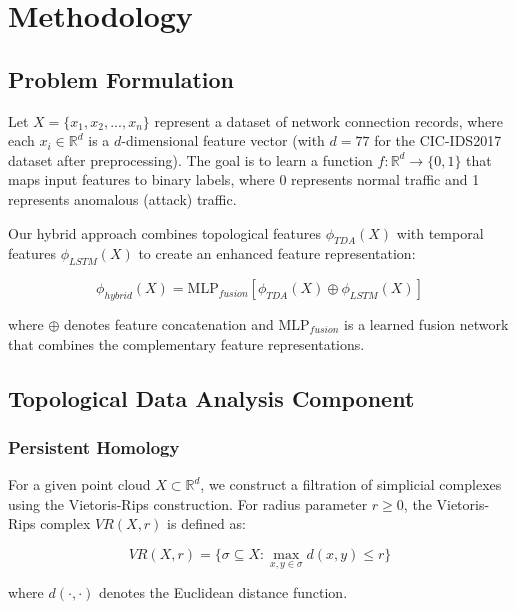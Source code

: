 \documentclass[conference]{IEEEtran}
\begin{document}
\section{Methodology}

\subsection{Problem Formulation}

Let $X = \{x_1, x_2, ..., x_n\}$ represent a dataset of network connection records, where each $x_i \in \mathbb{R}^d$ is a $d$-dimensional feature vector (with $d = 77$ for the CIC-IDS2017 dataset after preprocessing). The goal is to learn a function $f: \mathbb{R}^d \rightarrow \{0, 1\}$ that maps input features to binary labels, where 0 represents normal traffic and 1 represents anomalous (attack) traffic.

Our hybrid approach combines topological features $\phi_{TDA}(X)$ with temporal features $\phi_{LSTM}(X)$ to create an enhanced feature representation:

\begin{equation}
\phi_{hybrid}(X) = \text{MLP}_{fusion}\left[\phi_{TDA}(X) \oplus \phi_{LSTM}(X)\right]
\end{equation}

where $\oplus$ denotes feature concatenation and $\text{MLP}_{fusion}$ is a learned fusion network that combines the complementary feature representations.

\subsection{Topological Data Analysis Component}

\subsubsection{Persistent Homology}

For a given point cloud $X \subset \mathbb{R}^d$, we construct a filtration of simplicial complexes using the Vietoris-Rips construction. For radius parameter $r \geq 0$, the Vietoris-Rips complex $VR(X,r)$ is defined as:

\begin{equation}
VR(X,r) = \{\sigma \subseteq X : \max_{x,y \in \sigma} d(x,y) \leq r\}
\end{equation}

where $d(\cdot,\cdot)$ denotes the Euclidean distance function.
\end{document}
